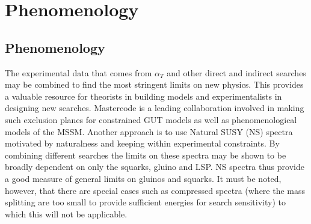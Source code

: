 
\chapter{Phenomenology} %

\label{Chapter5} %



\section{Phenomenology}
The experimental data that comes from $\alpha_T$ and other direct and indirect searches may be combined to find the most stringent limits on new physics. This provides a valuable resource for theorists in building models and experimentalists in designing new searches. Mastercode is a leading collaboration involved in making such exclusion planes for constrained GUT models as well as phenomenological models of the MSSM\cite{mcode}. Another approach is to use Natural SUSY (NS) spectra motivated by naturalness and keeping within experimental constraints\cite{joliver}. By combining different searches the limits on these spectra may be shown to be broadly dependent on only the squarks, gluino and LSP. NS spectra thus provide a good measure of general limits on gluinos and squarks. It must be noted, however, that there are special cases such as compressed spectra (where the mass splitting are too small to provide sufficient energies for search sensitivity) to which this will not be applicable.

